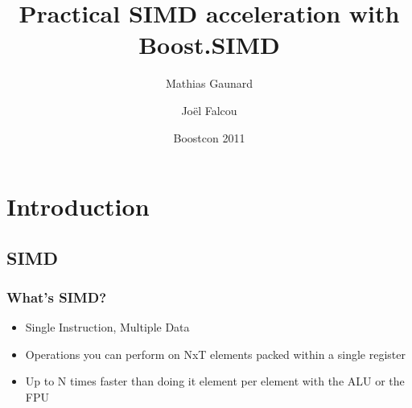 \documentclass{beamer}
\title%
{Practical SIMD acceleration with Boost.SIMD}
\author%
{Mathias Gaunard  \and Joël Falcou}
\institute[MetaScale] %
{MetaScale Inc.}
\date%
{Boostcon 2011}
\begin{document}
\begin{frame}
\titlepage
\end{frame}

\section{Introduction}

\subsection{SIMD}
\begin{frame}
	\frametitle{What's SIMD?}

	\begin{itemize}
		\item Single Instruction, Multiple Data
		\item Operations you can perform on NxT elements
		      packed within a single register
		\item Up to N times faster than doing it element per element
		      with the ALU or the FPU
	\end{itemize}

\end{frame}
\end{document}
